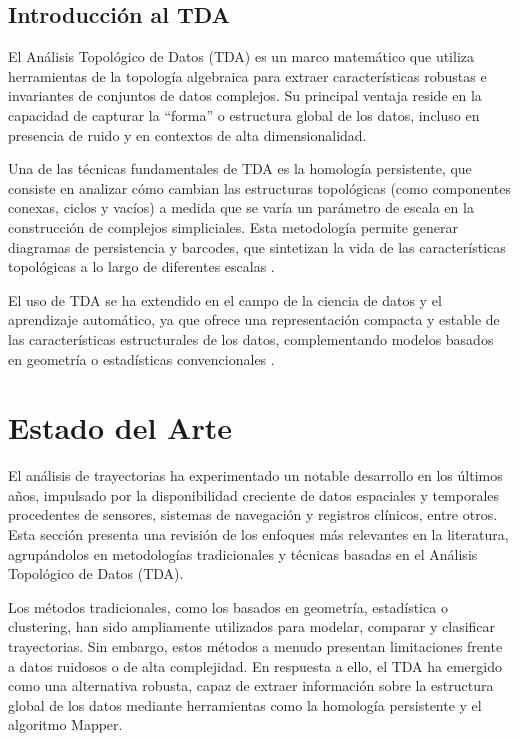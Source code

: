 \subsection{Introducción al TDA}

El Análisis Topológico de Datos (TDA) es un marco matemático que utiliza herramientas de la topología algebraica para extraer características robustas e invariantes de conjuntos de datos complejos. Su principal ventaja reside en la capacidad de capturar la “forma” o estructura global de los datos, incluso en presencia de ruido y en contextos de alta dimensionalidad.

\vspace{0.1cm}

Una de las técnicas fundamentales de TDA es la homología persistente, que consiste en analizar cómo cambian las estructuras topológicas (como componentes conexas, ciclos y vacíos) a medida que se varía un parámetro de escala en la construcción de complejos simpliciales. Esta metodología permite generar diagramas de persistencia y barcodes, que sintetizan la vida de las características topológicas a lo largo de diferentes escalas \cite{chazal2021introduction}.

\vspace{0.1cm}

El uso de TDA se ha extendido en el campo de la ciencia de datos y el aprendizaje automático, ya que ofrece una representación compacta y estable de las características estructurales de los datos, complementando modelos basados en geometría o estadísticas convencionales \cite{hensel2021survey}.


\section{Estado del Arte}

El análisis de trayectorias ha experimentado un notable desarrollo en los últimos años, impulsado por la disponibilidad creciente de datos espaciales y temporales procedentes de sensores, sistemas de navegación y registros clínicos, entre otros. Esta sección presenta una revisión de los enfoques más relevantes en la literatura, agrupándolos en metodologías tradicionales y técnicas basadas en el Análisis Topológico de Datos (TDA).

Los métodos tradicionales, como los basados en geometría, estadística o clustering, han sido ampliamente utilizados para modelar, comparar y clasificar trayectorias. Sin embargo, estos métodos a menudo presentan limitaciones frente a datos ruidosos o de alta complejidad. En respuesta a ello, el TDA ha emergido como una alternativa robusta, capaz de extraer información sobre la estructura global de los datos mediante herramientas como la homología persistente y el algoritmo Mapper.

